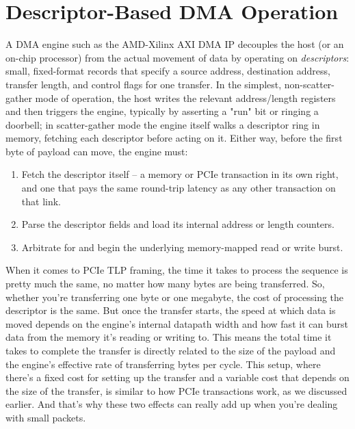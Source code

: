 
\section{Descriptor-Based DMA Operation}
\label{sec:ch3_dma}

A DMA engine such as the AMD-Xilinx AXI DMA \ac{IP} \cite{xilinx2021axidma} decouples the host (or an on-chip processor) from the actual movement of data by operating on \emph{descriptors}: small, fixed-format records that specify a source address, destination address, transfer length, and control flags for one transfer. In the simplest, non-scatter-gather mode of operation, the host writes the relevant address/length registers and then triggers the engine, typically by asserting a "run" bit or ringing a doorbell; in scatter-gather mode the engine itself walks a descriptor ring in memory, fetching each descriptor before acting on it. Either way, before the first byte of payload can move, the engine must:

\begin{enumerate}
\item Fetch the descriptor itself -- a memory or PCIe transaction in its own right, and one that pays the same round-trip latency as any other transaction on that link.
\item Parse the descriptor fields and load its internal address or length counters.
\item Arbitrate for and begin the underlying memory-mapped read or write burst.
\end{enumerate}

When it comes to PCIe TLP framing, the time it takes to process the sequence is pretty much the same, no matter how many bytes are being transferred. So, whether you're transferring one byte or one megabyte, the cost of processing the descriptor is the same. But once the transfer starts, the speed at which data is moved depends on the engine's internal datapath width and how fast it can burst data from the memory it's reading or writing to. This means the total time it takes to complete the transfer is directly related to the size of the payload and the engine's effective rate of transferring bytes per cycle. This setup, where there's a fixed cost for setting up the transfer and a variable cost that depends on the size of the transfer, is similar to how PCIe transactions work, as we discussed earlier. And that's why these two effects can really add up when you're dealing with small packets.

